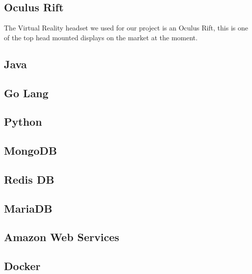\subsection {Oculus Rift}
The Virtual Reality headset we used for our project is an Oculus Rift, this is one of the top head mounted displays on the market at the moment.


\subsection {Java}
\subsection {Go Lang}
\subsection {Python}
\subsection {MongoDB}
\subsection {Redis DB}
\subsection {MariaDB}
\subsection {Amazon Web Services}
\subsection {Docker}
